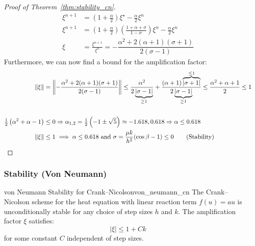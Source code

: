 \begin{proof}[Proof of Theorem~\ref{thm:stability_cn}]
\begin{align*}
    \xi^{n+1}               & = (1 + \tfrac{\alpha}{2}) \xi^\star - \tfrac{\alpha}{2} \xi^n                                                           \\
    \xi^{n+1}               & = \left(1 + \tfrac{\alpha}{2}\right)\left(\tfrac{1 + \alpha + \sigma}{1 - \sigma}\right)\xi^n - \tfrac{\alpha}{2} \xi^n \\
    \xi                     & = \tfrac{\xi^{n+1}}{\xi^n} = -\dfrac{\alpha^2 + 2(\alpha + 1) (\sigma + 1)}{2 (\sigma - 1)} \tag{Source: Trust me bro}
  \end{align*}
  Furthermore, we can now find a bound for the amplification factor:
  \begin{align*}
    \norm*{\xi}                                    & = \norm*{-\dfrac{\alpha^2 + 2(\alpha + 1)(\sigma + 1)}{2(\sigma - 1)}} \leq \dfrac{\alpha^2}{2\underbrace{\abs*{\sigma - 1}}_{\geq 1}} + \dfrac{(\alpha + 1)\overbrace{\abs*{\sigma + 1}}^{\leq 1}}{2\underbrace{\abs{\sigma - 1}}_{\geq 1}} \leq \dfrac{\alpha^2+ \alpha + 1}{2} \leq 1 \\                                                                                                                                                                                                                     \\
    \tfrac{1}{2}\left(\alpha^2 + \alpha - 1\right) & \leq 0 \Rightarrow \alpha_{1,2} = \tfrac{1}{2}\left(-1 \pm \sqrt{5}\right) \approx -1.618, 0.618 \Rightarrow \alpha \leq 0.618                                                                                                                                                           \\
    \norm*{\xi}                                    & \leq 1 \implies \alpha \leq 0.618 \text{ and } \sigma = \frac{\mu k}{h^2}(\cos\beta - 1) \leq 0 \tag{Stability}
  \end{align*}
\end{proof}

\subsubsection{Stability (Von Neumann)}
\begin{theorem}{von Neumann Stability for Crank--Nicolson}{von_neumann_cn}
  The Crank--Nicolson scheme for the heat equation with linear reaction term $f(u) = au$ is unconditionally stable for any choice of step sizes $h$ and $k$. The amplification factor $\xi$ satisfies:
  \[
    |\xi| \leq 1 + Ck
  \]
  for some constant $C$ independent of step sizes.
\end{theorem}


